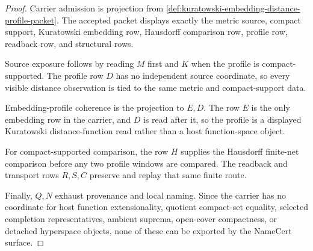 \begin{proof}
Carrier admission is projection from \autoref{def:kuratowski-embedding-distance-profile-packet}. The accepted packet displays exactly the metric source, compact support, Kuratowski embedding row, Hausdorff comparison row, profile row, readback row, and structural rows.

Source exposure follows by reading $M$ first and $K$ when the profile is compact-supported. The profile row $D$ has no independent source coordinate, so every visible distance observation is tied to the same metric and compact-support data.

Embedding-profile coherence is the projection to $E,D$. The row $E$ is the only embedding row in the carrier, and $D$ is read after it, so the profile is a displayed Kuratowski distance-function read rather than a host function-space object.

For compact-supported comparison, the row $H$ supplies the Hausdorff finite-net comparison before any two profile windows are compared. The readback and transport rows $R,S,C$ preserve and replay that same finite route.

Finally, $Q,N$ exhaust provenance and local naming. Since the carrier has no coordinate for host function extensionality, quotient compact-set equality, selected completion representatives, ambient suprema, open-cover compactness, or detached hyperspace objects, none of these can be exported by the NameCert surface.
\end{proof}

